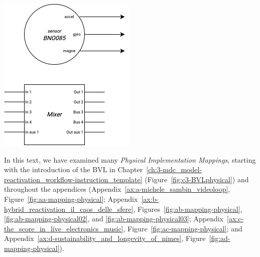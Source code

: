 \begin{minipage}[t]{0.45\textwidth}
    \centering
    \includegraphics[width=\linewidth]{chapters/4-MDC_model_application/image/bvl-physical_level02.png}
    \label{fig:c4-physical_level02}
\end{minipage}
\newline
In this text, we have examined many \textit{Physical Implementation Mappings}, starting with the introduction of the BVL in Chapter~\ref{ch:3-mdc_model-reactivation_workflow-instruction_template} (Figure~\ref{fig:c3-BVLphysical}) and throughout the appendices (Appendix~\ref{ax:a-michele_sambin_videoloop}, Figure~\ref{fig:aa-mapping-physical}; Appendix~\ref{ax:b-hybrid_reactivation_il_caos_delle_sfere}, Figures~\ref{fig:ab-mapping-physical}, \ref{fig:ab-mapping-physical02}, and \ref{fig:ab-mapping-physical03}; Appendix~\ref{ax:c-the_score_in_live_electronics_music}, Figure~\ref{fig:ac-mapping-physical}; and Appendix~\ref{ax:d-sustainability_and_longevity_of_nimes}, Figure~\ref{fig:ad-mapping-physical}).

